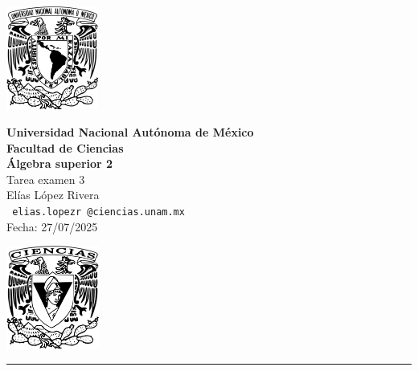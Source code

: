 \documentclass[11pt,letterpaper]{article}
\begin{document}

\begin{center}
    \begin{minipage}{3cm}
    	\begin{center}
    		\includegraphics[height=3.4cm]{logo_unam.png}
    	\end{center}
    \end{minipage}\hfill
    \begin{minipage}{10cm}
    	\begin{center}
    	\textbf{\large Universidad Nacional Autónoma de México}\\[0.1cm]
        \textbf{Facultad de Ciencias}\\[0.1cm]
        \textbf{\'Algebra superior 2}\\[0.1cm]
        Tarea examen 3 \\[0.1cm]
         El\'ias L\'opez Rivera\\[0.1cm]
        \texttt{ elias.lopezr\,@ciencias.unam.mx }\\[0.1cm]
        Fecha:\,\,27/07/2025
    	\end{center}
    \end{minipage}\hfill
    \begin{minipage}{3cm}
    	\begin{center}
    		\includegraphics[height=3.4cm]{Logo_FC.png}
    	\end{center}
    \end{minipage}
\end{center}

\rule{17cm}{0.1mm}

\,\\
\end{document}
